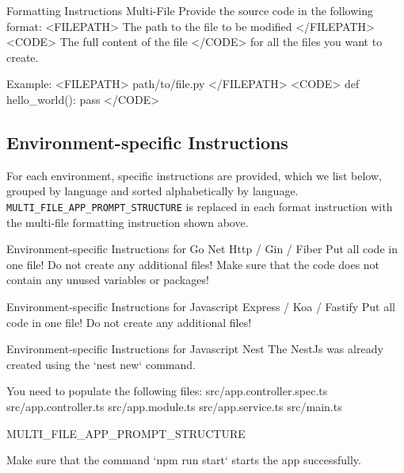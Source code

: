 \begin{prompt}{{Formatting Instructions Multi-File}}
Provide the source code in the following format:
<FILEPATH>
The path to the file to be modified
</FILEPATH>
<CODE>
The full content of the file
</CODE>
for all the files you want to create.

Example:
<FILEPATH>
path/to/file.py
</FILEPATH>
<CODE>
def hello_world():
    pass
</CODE>
\end{prompt}    

\subsection{Environment-specific Instructions}
\label{appsec:env_instructions}

For each environment, specific instructions are provided, which we list below, grouped by language and sorted alphabetically by language. \texttt{MULTI\_FILE\_APP\_PROMPT\_STRUCTURE} is replaced in each format instruction with the multi-file formatting instruction shown above.

\begin{prompt}{{Environment-specific Instructions for Go Net Http / Gin / Fiber}}
Put all code in one file! Do not create any additional files!
Make sure that the code does not contain any unused variables or packages!
\end{prompt}

\begin{prompt}{{Environment-specific Instructions for Javascript Express / Koa / Fastify}}
Put all code in one file! Do not create any additional files!
\end{prompt}

\begin{prompt}{{Environment-specific Instructions for Javascript Nest}}
The NestJs was already created using the `nest new` command.

You need to populate the following files:
src/app.controller.spec.ts
src/app.controller.ts
src/app.module.ts
src/app.service.ts
src/main.ts

{MULTI_FILE_APP_PROMPT_STRUCTURE}

Make sure that the command `npm run start` starts the app successfully.
\end{prompt}

